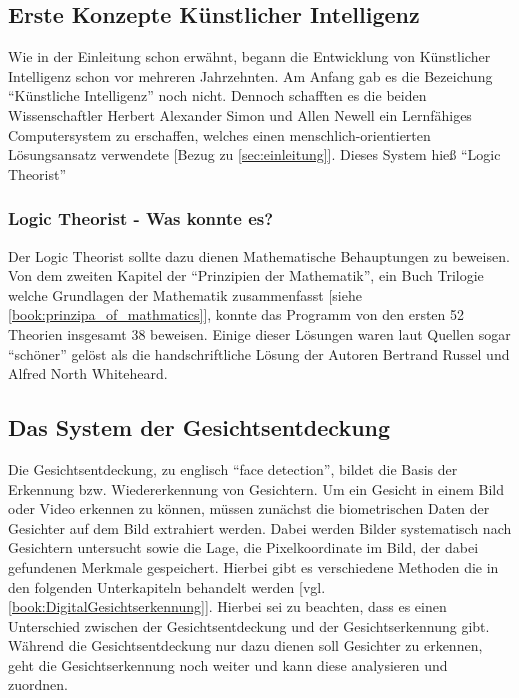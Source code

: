     \subsection{Erste Konzepte Künstlicher Intelligenz}
    \label{subsec:Theorie:Erste_Konzepte_von_KI}
        Wie in der Einleitung schon erwähnt, begann die Entwicklung von Künstlicher Intelligenz schon vor mehreren Jahrzehnten. Am Anfang gab es die Bezeichung \enquote{Künstliche Intelligenz} noch nicht. Dennoch schafften es die beiden Wissenschaftler Herbert Alexander Simon und Allen Newell ein Lernfähiges Computersystem zu erschaffen, welches einen menschlich-orientierten Lösungsansatz verwendete [Bezug zu \ref{sec:einleitung}]. Dieses System hieß \enquote{Logic Theorist}
        
        \subsubsection{Logic Theorist - Was konnte es?}
        \label{subsubsec:Logic_Theorist:Was_konnte_es}
            Der Logic Theorist sollte dazu dienen Mathematische Behauptungen zu beweisen. Von dem zweiten Kapitel der \enquote{Prinzipien der Mathematik}, ein Buch Trilogie welche Grundlagen der Mathematik zusammenfasst [siehe \ref{book:prinzipa_of_mathmatics}], konnte das Programm von den ersten 52 Theorien insgesamt 38 beweisen. Einige dieser Lösungen waren laut Quellen sogar \enquote{schöner} gelöst als die handschriftliche Lösung der Autoren Bertrand Russel und Alfred North Whiteheard.

    \subsection{Das System der Gesichtsentdeckung}
    \label{subsec:system_of_face_detection}
        Die Gesichtsentdeckung, zu englisch \enquote{face detection}, bildet die Basis der Erkennung bzw. Wiedererkennung von Gesichtern. Um ein Gesicht in einem Bild oder Video erkennen zu können, müssen zunächst die biometrischen Daten der Gesichter auf dem Bild extrahiert werden. Dabei werden Bilder systematisch nach Gesichtern untersucht sowie die Lage, die Pixelkoordinate im Bild, der dabei gefundenen Merkmale gespeichert. Hierbei gibt es verschiedene Methoden die in den folgenden Unterkapiteln behandelt werden [vgl. \ref{book:DigitalGesichtserkennung}]. Hierbei sei zu beachten, dass es einen Unterschied zwischen der Gesichtsentdeckung und der Gesichtserkennung gibt. Während die Gesichtsentdeckung nur dazu dienen soll Gesichter zu erkennen, geht die Gesichtserkennung noch weiter und kann diese analysieren und zuordnen.

